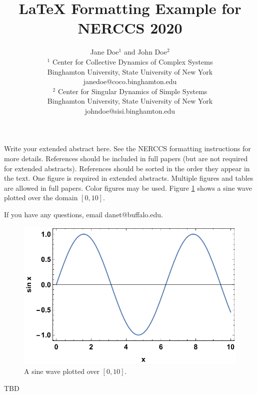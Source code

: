 \documentclass[12pt]{article}
\begin{document}
\title{\normalsize\bf \vspace{-8ex}
LaTeX Formatting Example for NERCCS 2020}

\author{Jane Doe$^1$ and John Doe$^2$\\
$^1$ Center for Collective Dynamics of Complex Systems\\
Binghamton University, State University of New York\\
janedoe@coco.binghamton.edu\\
$^2$ Center for Singular Dynamics of Simple Systems\\
Binghamton University, State University of New York\\
johndoe@sisi.binghamton.edu}

\date{\vspace{-5ex}} %

\maketitle

\thispagestyle{empty}
\pagestyle{empty}


Write your extended abstract here.  See the NERCCS formatting instructions \cite{nerccsinstructions} for more details. References should be included in full papers (but are not required for extended abstracts).  References should be sorted in the order they appear in the text.  One figure is required in extended abstracts. Multiple figures and tables are allowed in full papers. Color figures may be used. Figure \ref{fig:sinx} shows a sine wave plotted over the domain $[0,10]$.

If you have any questions, email danet@buffalo.edu.


\begin{figure}[h]
\centering
\includegraphics[width=0.5\columnwidth]{fig1.pdf}
\caption{A sine wave plotted over $[0,10]$.}
\label{fig:sinx}
\end{figure}

 
\begin{thebibliography}{99}
 TBD
\end{thebibliography}
\end{document}
